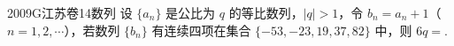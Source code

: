 
\begin{problem}{2009}{G}{江苏卷}{14}{数列}
设 $\{a_n\}$ 是公比为 $q$ 的等比数列，$|q|>1$，令 $b_n=a_n+1$（$n=1,2,\cdots$），若数列 $\{b_n\}$ 有连续四项在集合 $\{-53,-23,19,37,82\}$ 中，则 $6q=$\underline{\hspace{4em}}.
\end{problem}

\begin{answer}

\end{answer}

\begin{solutions}

\end{solutions}